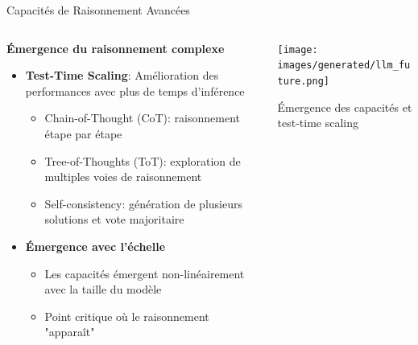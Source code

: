 \documentclass[aspectratio=169,11pt]{beamer}
\begin{document}
\begin{frame}{Capacités de Raisonnement Avancées}
    \begin{columns}
        \begin{column}{0.55\textwidth}
            \textbf{Émergence du raisonnement complexe}
            \begin{itemize}
                \item \textbf{Test-Time Scaling}: Amélioration des performances avec plus de temps d'inférence
                \begin{itemize}
                    \item Chain-of-Thought (CoT): raisonnement étape par étape
                    \item Tree-of-Thoughts (ToT): exploration de multiples voies de raisonnement
                    \item Self-consistency: génération de plusieurs solutions et vote majoritaire
                \end{itemize}
                \vspace{0.3cm}
                \item \textbf{Émergence avec l'échelle}
                \begin{itemize}
                    \item Les capacités émergent non-linéairement avec la taille du modèle
                    \item Point critique où le raisonnement "apparaît"
                \end{itemize}
            \end{itemize}
        \end{column}
        \begin{column}{0.45\textwidth}
            \texttt{[image: images/generated/llm\_future.png]}
            \vspace{0.2cm}
            \begin{center}
                \small{Émergence des capacités et test-time scaling}
            \end{center}
        \end{column}
    \end{columns}
\end{frame}
\end{document}

